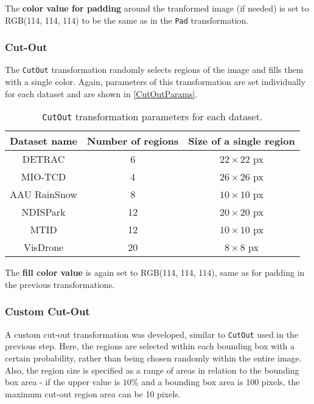 The \textbf{color value for padding} around the tranformed image (if needed)
is set to RGB(114, 114, 114) to be the same as in the \texttt{Pad} transformation.

\subsubsection*{Cut-Out}

The \texttt{CutOut} transformation randomly selects regions of the image and
fills them with a single color. Again, parameters of this transformation are set
individually for each dataset and are shown in \autoref{CutOutParams}.

\begin{table}[h]
\centering
\begin{tabular}{|c|c|c|}
    \hline
    Dataset name & Number of regions & Size of a single region \\
    \hline
    DETRAC       &  6 & $22 \times 22$ px \\
    MIO-TCD      &  4 & $26 \times 26$ px \\
    AAU RainSnow &  8 & $10 \times 10$ px \\
    NDISPark     & 12 & $20 \times 20$ px \\
    MTID         & 12 & $10 \times 10$ px \\
    VisDrone     & 20 & $8 \times 8$ px \\
    \hline
\end{tabular}
\caption{\texttt{CutOut} transformation parameters for each dataset.}
\label{CutOutParams}
\end{table}

The \textbf{fill color value} is again set to RGB(114, 114, 114), same as for
padding in the previous transformations.

\subsubsection*{Custom Cut-Out}

A custom cut-out transformation was developed, similar to \texttt{CutOut} used
in the previous step. Here, the regions are selected within each bounding box
with a certain probability, rather than being chosen randomly within the entire image.
Also, the region size is specified as a range of areas in relation to the
bounding box area - if the upper value is $10\%$ and a bounding box area is 100
pixels, the maximum cut-out region area can be 10 pixels.

